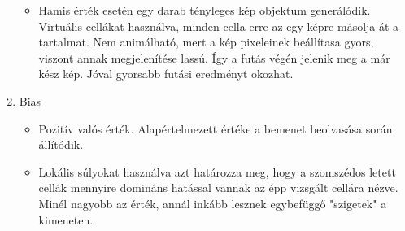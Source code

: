 \begin{enumerate}
\begin{itemize}
        \item Hamis érték esetén egy darab tényleges kép objektum generálódik. Virtuális cellákat használva, minden cella erre az egy képre másolja át a tartalmat. Nem animálható, mert a kép pixeleinek beállítasa gyors, viszont annak megjelenítése lassú. Így a futás végén jelenik meg a már kész kép. Jóval gyorsabb futási eredményt okozhat.
    \end{itemize}
    \item{Bias}
    \begin{itemize}
        \item Pozitív valós érték. Alapértelmezett értéke a bemenet beolvasása során állítódik.
        \item Lokális súlyokat használva azt határozza meg, hogy a szomszédos letett cellák mennyire domináns hatással vannak az épp vizsgált cellára nézve. Minél nagyobb az érték, annál inkább lesznek egybefüggő "szigetek" a kimeneten.
    \end{itemize}
\end{enumerate}

